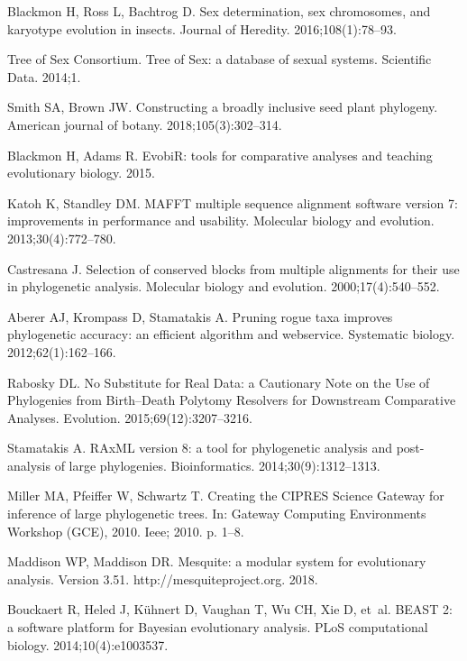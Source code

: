 \documentclass[]{rsos}%
\begin{document}
\begin{thebibliography}{99}
Blackmon H, Ross L, Bachtrog D.
 Sex determination, sex chromosomes, and karyotype evolution in
  insects.
 Journal of Heredity. 2016;108(1):78--93.

{Tree of Sex Consortium}.
 Tree of Sex: a database of sexual systems.
 Scientific Data. 2014;1.

Smith SA, Brown JW.
 Constructing a broadly inclusive seed plant phylogeny.
 American journal of botany. 2018;105(3):302--314.

Blackmon H, Adams R. EvobiR: tools for comparative analyses and teaching
  evolutionary biology. 2015.

Katoh K, Standley DM.
 MAFFT multiple sequence alignment software version 7: improvements in
  performance and usability.
 Molecular biology and evolution. 2013;30(4):772--780.

Castresana J.
 Selection of conserved blocks from multiple alignments for their use
  in phylogenetic analysis.
 Molecular biology and evolution. 2000;17(4):540--552.

Aberer AJ, Krompass D, Stamatakis A.
 Pruning rogue taxa improves phylogenetic accuracy: an efficient
  algorithm and webservice.
 Systematic biology. 2012;62(1):162--166.

Rabosky DL.
 No Substitute for Real Data: a Cautionary Note on the Use of
  Phylogenies from Birth--Death Polytomy Resolvers for Downstream Comparative
  Analyses.
 Evolution. 2015;69(12):3207--3216.

Stamatakis A.
 RAxML version 8: a tool for phylogenetic analysis and post-analysis
  of large phylogenies.
 Bioinformatics. 2014;30(9):1312--1313.

Miller MA, Pfeiffer W, Schwartz T.
 Creating the CIPRES Science Gateway for inference of large
  phylogenetic trees.
 In: Gateway Computing Environments Workshop (GCE), 2010. Ieee; 2010.
  p. 1--8.

Maddison WP, Maddison DR.
 Mesquite: a modular system for evolutionary analysis. Version 3.51.
 http://mesquiteproject.org. 2018.

Bouckaert R, Heled J, K{\"u}hnert D, Vaughan T, Wu CH, Xie D, et~al.
 BEAST 2: a software platform for Bayesian evolutionary analysis.
 PLoS computational biology. 2014;10(4):e1003537.


\end{thebibliography}
\end{document}
